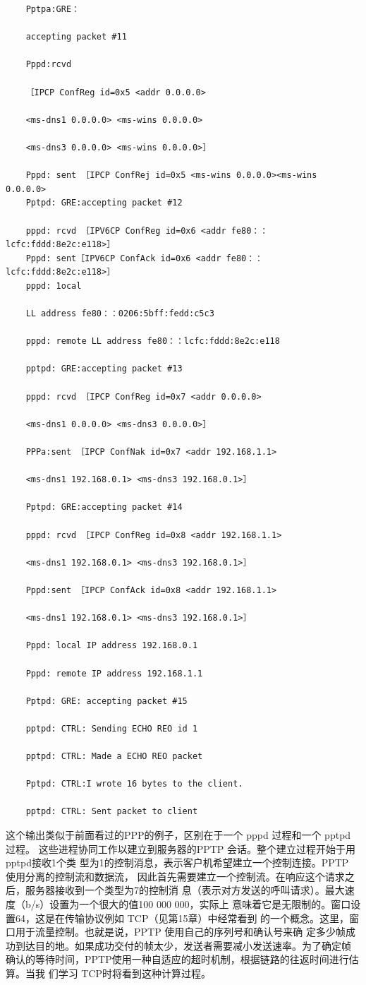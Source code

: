 \begin{verbatim}
    Pptpa:GRE：
    
    accepting packet #11
    
    Pppd:rcvd
    
    ［IPCP ConfReg id=0x5 <addr 0.0.0.0>
    
    <ms-dns1 0.0.0.0> <ms-wins 0.0.0.0>
    
    <ms-dns3 0.0.0.0> <ms-wins 0.0.0.0>］
    
    Pppd: sent ［IPCP ConfRej id=0x5 <ms-wins 0.0.0.0><ms-wins 0.0.0.0>
    Pptpd: GRE:accepting packet #12
    
    pppd: rcvd ［IPV6CP ConfReg id=0x6 <addr fe80：：lcfc:fddd:8e2c:e118>］
    Pppd: sent［IPV6CP ConfAck id=0x6 <addr fe80：：lcfc:fddd:8e2c:e118>］
    pppd: 1ocal
    
    LL address fe80：：0206:5bff:fedd:c5c3
    
    pppd: remote LL address fe80：：lcfc:fddd:8e2c:e118
    
    pptpd: GRE:accepting packet #13
    
    pppd: rcvd ［IPCP ConfReg id=0x7 <addr 0.0.0.0>
    
    <ms-dns1 0.0.0.0> <ms-dns3 0.0.0.0>］
    
    PPPa:sent ［IPCP ConfNak id=0x7 <addr 192.168.1.1>
    
    <ms-dns1 192.168.0.1> <ms-dns3 192.168.0.1>］
    
    Pptpd: GRE:accepting packet #14
    
    pppd: rcvd ［IPCP ConfReg id=0x8 <addr 192.168.1.1>
    
    <ms-dns1 192.168.0.1> <ms-dns3 192.168.0.1>］
    
    Pppd:sent ［IPCP ConfAck id=0x8 <addr 192.168.1.1>
    
    <ms-dns1 192.168.0.1> <ms-dns3 192.168.0.1>］
    
    Pppd: local IP address 192.168.0.1
    
    Pppd: remote IP address 192.168.1.1
    
    Pptpd: GRE: accepting packet #15
    
    pptpd: CTRL: Sending ECHO REO id 1
    
    pptpd: CTRL: Made a ECHO REO packet
    
    Pptpd: CTRL:I wrote 16 bytes to the client.
    
    pptpd: CTRL: Sent packet to client
\end{verbatim}

这个输出类似于前面看过的PPP的例子，区别在于一个 pppd 过程和一个 pptpd 过程。
这些进程协同工作以建立到服务器的PPTP 会话。整个建立过程开始于用pptpd接收1个类
型为1的控制消息，表示客户机希望建立一个控制连接。PPTP 使用分离的控制流和数据流，
因此首先需要建立一个控制流。在响应这个请求之后，服务器接收到一个类型为7的控制消
息（表示对方发送的呼叫请求）。最大速度（b/s）设置为一个很大的值100 000 000，实际上
意味着它是无限制的。窗口设置64，这是在传输协议例如 TCP（见第15章）中经常看到
的一个概念。这里，窗口用于流量控制。也就是说，PPTP 使用自己的序列号和确认号来确
定多少帧成功到达目的地。如果成功交付的帧太少，发送者需要减小发送速率。为了确定帧
确认的等待时间，PPTP使用一种自适应的超时机制，根据链路的往返时间进行估算。当我
们学习 TCP时将看到这种计算过程。

